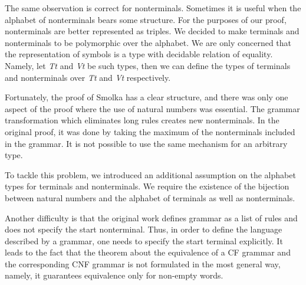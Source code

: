 The same observation is correct for nonterminals.
Sometimes it is useful when the alphabet of nonterminals bears some structure.
For the purposes of our proof, nonterminals are better represented as triples.
We decided to make terminals and nonterminals to be polymorphic over the alphabet.
We are only concerned that the representation of symbols is a type with decidable relation of equality.
Namely, let \textit{Tt} and \textit{Vt} be such types, then we can define the types of terminals and nonterminals over \textit{Tt} and \textit{Vt} respectively.


Fortunately, the proof of Smolka has a clear structure, and there was only one aspect of the proof where the use of natural numbers was essential. The grammar transformation which eliminates long rules creates new nonterminals. In the original proof, it was done by taking the maximum of the nonterminals included in the grammar.
It is not possible to use the same mechanism for an arbitrary type.

To tackle this problem, we introduced an additional assumption on the alphabet types for terminals and nonterminals. We require the existence of the bijection between natural numbers and the alphabet of terminals as well as nonterminals.

Another difficulty is that the original work defines grammar as a list of rules and does not specify the start nonterminal. Thus, in order to define the language described by a  grammar, one needs to specify the start terminal explicitly. It leads to the fact that the theorem about the equivalence of a CF grammar and the corresponding CNF grammar is not formulated in the most general way, namely, it guarantees equivalence only for non-empty words.


